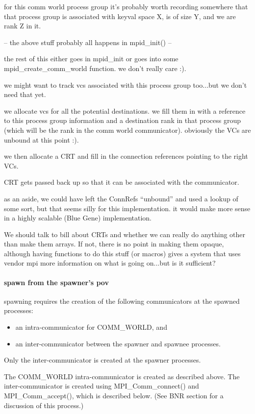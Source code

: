 for this comm world process group it's probably worth recording somewhere that
that process group is associated with keyval space X, is of size Y, and we are
rank Z in it.

-- the above stuff probably all happens in mpid_init() --

the rest of this either goes in mpid_init or goes into some
mpid_create_comm_world function.  we don't really care :).

we might want to track vcs associated with this process group too...but we
don't need that yet.

we allocate vcs for all the potential destinations.  we fill them in with a
reference to this process group information and a destination rank in that
process group (which will be the rank in the comm world communicator).
obviously the VCs are unbound at this point :).

we then allocate a CRT and fill in the connection references pointing to the
right VCs.

CRT gets passed back up so that it can be associated with the communicator.

as an aside, we could have left the ConnRefs ``unbound'' and used a lookup of
some sort, but that seems silly for this implementation.  it would make more
sense in a highly scalable (Blue Gene) implementation.

We should talk to bill about CRTs and whether we can really do anything other
than make them arrays.  If not, there is no point in making them opaque,
although having functions to do this stuff (or macros) gives a system that uses
vendor mpi more information on what is going on...but is it sufficient?


\paragraph{spawn from the spawner's pov}

spawning requires the creation of the following communicators at the spawned
processes:
\begin{itemize}
\item an intra-communicator for COMM_WORLD, and
\item an inter-communicator between the spawner and spawnee processes.
\end{itemize}
Only the inter-communicator is created at the spawner processes.

The COMM_WORLD intra-communicator is created as described above.  The
inter-communicator is created using MPI_Comm_connect() and MPI_Comm_accept(),
which is described below.  (See BNR section for a discussion of this process.)

